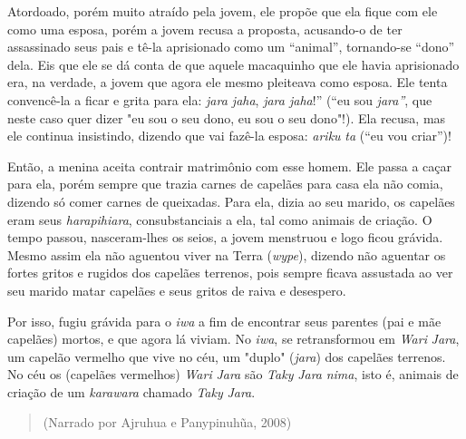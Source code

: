Atordoado, porém muito atraído pela jovem, ele propõe que ela fique com
ele como uma esposa, porém a jovem recusa a proposta, acusando-o de ter
assassinado seus pais e tê-la aprisionado como um ``animal'',
tornando-se ``dono'' dela. Eis que ele se dá conta de que aquele
macaquinho que ele havia aprisionado era, na verdade, a jovem que agora
ele mesmo pleiteava como esposa. Ele tenta convencê-la a ficar e grita
para ela: \emph{jara jaha}, \emph{jara jaha}!'' (``eu sou \emph{jara''},
que neste caso quer dizer "eu sou o seu dono, eu sou o seu dono"!). Ela
recusa, mas ele continua insistindo, dizendo que vai fazê-la esposa:
\emph{ariku} \emph{ta} (``eu vou criar'')!

Então, a menina aceita contrair matrimônio com esse homem. Ele passa a
caçar para ela, porém sempre que trazia carnes de capelães para casa ela
não comia, dizendo só comer carnes de queixadas. Para ela, dizia ao seu
marido, os capelães eram seus \emph{harapihiara}, consubstanciais a ela,
tal como animais de criação. O tempo passou, nasceram-lhes os seios, a
jovem menstruou e logo ficou grávida. Mesmo assim ela não aguentou viver
na Terra (\emph{wype}), dizendo não aguentar os fortes gritos e rugidos
dos capelães terrenos, pois sempre ficava assustada ao ver seu marido
matar capelães e seus gritos de raiva e desespero.

Por isso, fugiu grávida para o \emph{iwa} a fim de encontrar seus
parentes (pai e mãe capelães) mortos, e que agora lá viviam. No
\emph{iwa}, se retransformou em \emph{Wari} \emph{Jara}, um capelão
vermelho que vive no céu, um "duplo" (\emph{jara}) dos capelães
terrenos. No céu os (capelães vermelhos) \emph{Wari} \emph{Jara} são
\emph{Taky} \emph{Jara} \emph{nima}, isto é, animais de criação de um
\emph{karawara} chamado \emph{Taky} \emph{Jara}.

\begin{quote}
(Narrado por Ajruhua e Panypinuhũa, 2008)
\end{quote}

